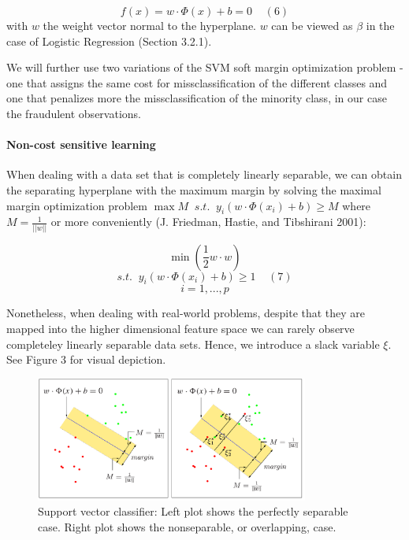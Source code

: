 \documentclass[12pt,]{article}
\let\oldparagraph\paragraph
\renewcommand{\paragraph}[1]{\oldparagraph{#1}\mbox{}}
\begin{document}
\[f(x) = w\cdot\Phi(x)+b=0\;\;\;\;(6)\] with \(w\) the weight vector
normal to the hyperplane. \(w\) can be viewed as \(\beta\) in the case
of Logistic Regression (Section 3.2.1).

We will further use two variations of the SVM soft margin optimization
problem - one that assigns the same cost for missclassification of the
different classes and one that penalizes more the missclassification of
the minority class, in our case the fraudulent observations.

\hypertarget{non-cost-sensitive-learning}{%
\paragraph{Non-cost sensitive
learning}\label{non-cost-sensitive-learning}}

When dealing with a data set that is completely linearly separable, we
can obtain the separating hyperplane with the maximum margin by solving
the maximal margin optimization problem
\(\max M \;\;s.t.\;\;y_i(w \cdot \Phi(x_i) + b) \geq M\) where
\(M=\frac{1}{||w||}\) or more conveniently (J. Friedman, Hastie, and
Tibshirani 2001):

\[\min(\frac{1}{2}w\cdot w)\]
\[s.t. \;\; y_i(w \cdot \Phi(x_i) + b) \geq 1\;\;\;\;(7)\] \[i=1,...,p\]

Nonetheless, when dealing with real-world problems, despite that they
are mapped into the higher dimensional feature space we can rarely
observe completeley linearly separable data sets. Hence, we introduce a
slack variable \(\xi\). See Figure 3 for visual depiction.

\begin{figure}
\centering
\includegraphics[width=0.8\textwidth,height=\textheight]{figures/svm.png}
\caption{Support vector classifier: Left plot shows the perfectly
separable case. Right plot shows the nonseparable, or overlapping,
case.}
\end{figure}
\end{document}
